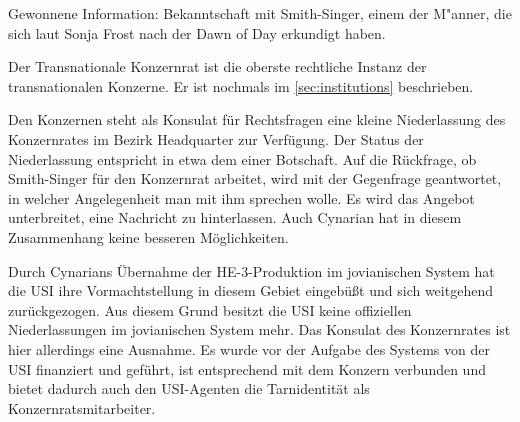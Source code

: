 \begin{remarks}
	Gewonnene Information: Bekanntschaft mit Smith-Singer, einem der M"anner, die sich laut Sonja Frost nach der Dawn of Day erkundigt haben.

	Der Transnationale Konzernrat ist die oberste rechtliche Instanz der transnationalen Konzerne. Er ist nochmals im \cref{sec:institutions} beschrieben.

	Den Konzernen steht als Konsulat für Rechtsfragen eine kleine Niederlassung des Konzernrates im Bezirk Headquarter zur Verfügung. Der Status der Niederlassung entspricht in etwa dem einer Botschaft. Auf die Rückfrage, ob Smith-Singer für den Konzernrat arbeitet, wird mit der Gegenfrage geantwortet, in welcher Angelegenheit man mit ihm sprechen wolle. Es wird das Angebot unterbreitet, eine Nachricht zu hinterlassen. Auch Cynarian hat in diesem Zusammenhang keine besseren Möglichkeiten.
	
	Durch Cynarians Übernahme der HE-3-Produktion im jovianischen System hat die USI ihre Vormachtstellung in diesem Gebiet eingebüßt und sich weitgehend zurückgezogen. Aus diesem Grund besitzt die USI keine offiziellen Niederlassungen im jovianischen System mehr. Das Konsulat des Konzernrates ist hier allerdings eine Ausnahme. Es wurde vor der Aufgabe des Systems von der USI finanziert und geführt, ist entsprechend mit dem Konzern verbunden und bietet dadurch auch den USI-Agenten die Tarnidentität als Konzernratsmitarbeiter.
\end{remarks}
